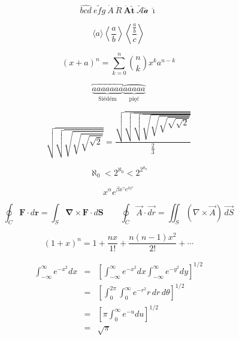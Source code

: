 \pagestyle{empty}

\begin{displaymath}
  \widehat{bcd} \ \widetilde{efg} \ \dot A \ \dot R  \ \mathbf{\dot A \check t} 
  \  \check{\mathcal{A}} \check{\mathcal{a}} \ \mathbf{\acute \imath}
\end{displaymath}

\begin{displaymath}
  \langle a \rangle \left\langle \frac{a}{b} \right\rangle
  \left\langle \frac{\frac{a}{b}}{c} \right\rangle
\end{displaymath}

\begin{displaymath}
  (x + a)^n = \sum_{k=0}^n {n \choose k} x^k a^{n-k}
\end{displaymath}

\begin{displaymath}
 \underbrace{\overbracket{aaaaaaa}}_\textrm{Siédém}
 \underbrace{\overparen{aaaaa}}_\textrm{pięć}
\end{displaymath}

\begin{displaymath}
 \sqrt{\sqrt{\sqrt{\sqrt{\sqrt{\sqrt{2}}}}}} =
 \frac{\sqrt{\sqrt{\sqrt{\sqrt{\sqrt{\sqrt{\sqrt{\sqrt{2}}}}}}}}}{\frac{2}{3}}
\end{displaymath}

\begin{displaymath}
 \aleph_{0}<2^{\aleph_0}<2^{2^{\aleph_0}}
\end{displaymath}

\begin{displaymath}
x^{\alpha} e^{\beta x^{\gamma} e^{\delta x^{\epsilon}}}
\end{displaymath}

\begin{displaymath}
 \oint_C\mathbf{F}\cdot d\mathbf{r}=\int_S\mathbf{\nabla}\times\mathbf{F}\cdot d\mathbf{S}\qquad
 \oint_C\vec{A}\cdot\vec{dr}=\iint_S(\nabla\times\vec{A})\,\vec{dS}
\end{displaymath}

\begin{displaymath}
 (1+x)^n=1+\frac{nx}{1!}+\frac{n(n-1)x^2}{2!}+\cdots
\end{displaymath}

\setlength\arraycolsep{0.15em}
\begin{eqnarray*}
 \int_{-\infty}^\infty e^{-x^2}dx &=& \left[\int_{-\infty}^\infty e^{-x^2}dx
  \int_{-\infty}^\infty e^{-y^2}dy\right]^{1/2}\\
 &=& \left[\int_{0}^{2\pi} \int_0^\infty e^{-r^2}r\,dr\,d\theta\right]^{1/2}\\
 &=& \left[\pi\int_{0}^\infty e^{-u}du\right]^{1/2}\\
 &=& \sqrt{\pi}
\end{eqnarray*}

\endinput